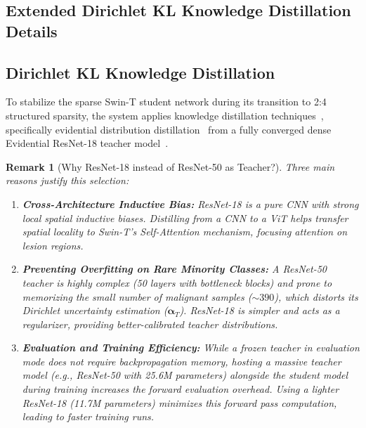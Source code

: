 \documentclass[letterpaper]{article} %
\newtheorem{remark}{Remark}
\begin{document}

\subsection{Extended Dirichlet KL Knowledge Distillation Details}
\subsection{Dirichlet KL Knowledge Distillation}\label{subsec:distillation}

To stabilize the sparse Swin-T student network during its transition to 2:4 structured sparsity, the system applies knowledge distillation techniques~\cite{hinton2015distilling, gou2021knowledge}, specifically evidential distribution distillation~\cite{malinin2019ensemble} from a fully converged dense Evidential ResNet-18 teacher model~\cite{he2016deep}.

\begin{remark}[Why ResNet-18 instead of ResNet-50 as Teacher?]
Three main reasons justify this selection:
\begin{enumerate}[label=(\roman*)]
    \item \textbf{Cross-Architecture Inductive Bias:} ResNet-18 is a pure CNN with strong local spatial inductive biases. Distilling from a CNN to a ViT helps transfer spatial locality to Swin-T's Self-Attention mechanism, focusing attention on lesion regions.
    \item \textbf{Preventing Overfitting on Rare Minority Classes:} A ResNet-50 teacher is highly complex (50 layers with bottleneck blocks) and prone to memorizing the small number of malignant samples (${\sim}390$), which distorts its Dirichlet uncertainty estimation ($\bm{\alpha}_T$). ResNet-18 is simpler and acts as a regularizer, providing better-calibrated teacher distributions.
    \item \textbf{Evaluation and Training Efficiency:} While a frozen teacher in evaluation mode does not require backpropagation memory, hosting a massive teacher model (e.g., ResNet-50 with 25.6M parameters) alongside the student model during training increases the forward evaluation overhead. Using a lighter ResNet-18 (11.7M parameters) minimizes this forward pass computation, leading to faster training runs.
\end{enumerate}
\end{remark}
\end{document}
